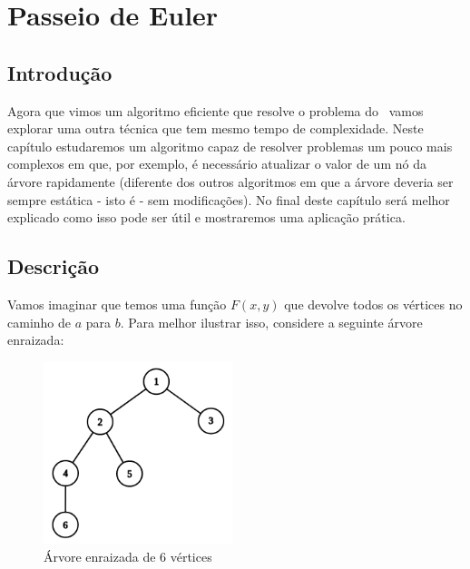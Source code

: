 \chapter{Passeio de Euler}
\label{cap:passeio-euler}

\section{Introdução}

Agora que vimos um algoritmo eficiente que resolve o problema do \LCA\, vamos explorar uma outra técnica que tem mesmo tempo de complexidade. Neste capítulo estudaremos um algoritmo capaz de resolver problemas um pouco mais complexos em que, por exemplo, é necessário atualizar o valor de um nó da árvore rapidamente (diferente dos outros algoritmos em que a árvore deveria ser sempre estática - isto é - sem modificações). No final deste capítulo será melhor explicado como isso pode ser útil e mostraremos uma aplicação prática.


\section{Descrição}

Vamos imaginar que temos uma função $F(x, y)$ que devolve todos os vértices no caminho de $a$ para $b$. Para melhor ilustrar isso, considere a seguinte árvore enraizada:

\vspace{0.5cm}

\begin{figure}[htb]
\begin{center}
\includegraphics[width=5.5cm]{images/graph_euler.png}
\end{center}
\caption{\label{fig:arvore-euler}Árvore enraizada de 6 vértices}
\end{figure}

\vspace{0.5cm}

